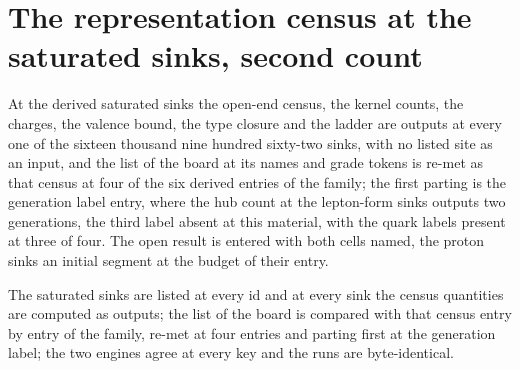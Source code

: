 \section{The representation census at the saturated sinks, second count}\label{mod:IV-3-D536028-w-rcsy}
\begin{chwall}\label{box:IV-3-D536028-w-rcsy:1}
At the derived saturated sinks the open-end census, the kernel counts, the charges, the valence bound, the type closure and the ladder are outputs at every one of the sixteen thousand nine hundred sixty-two sinks, with no listed site as an input, and the list of the board at its names and grade tokens is re-met as that census at four of the six derived entries of the family; the first parting is the generation label entry, where the hub count at the lepton-form sinks outputs two generations, the third label absent at this material, with the quark labels present at three of four. The open result is entered with both cells named, the proton sinks an initial segment at the budget of their entry.
\end{chwall}
The saturated sinks are listed at every id and at every sink the census quantities are computed as outputs; the list of the board is compared with that census entry by entry of the family, re-met at four entries and parting first at the generation label; the two engines agree at every key and the runs are byte-identical.

